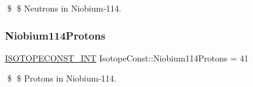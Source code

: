 \$ \$ Neutrons in Niobium-\/114. \mbox{\label{group___isotope_const-_niobium-_nb114_ga6ef4465dfe4e0651754b87ba511a439a}} 
\subsubsection{\texorpdfstring{Niobium114\+Protons}{Niobium114Protons}}
{\footnotesize\ttfamily \mbox{\hyperlink{group___isotope_const-_macros_ga5f18360b3e99483a35c32d789e62621c}{I\+S\+O\+T\+O\+P\+E\+C\+O\+N\+S\+T\+\_\+\+I\+NT}} Isotope\+Const\+::\+Niobium114\+Protons = 41}

\$ \$ Protons in Niobium-\/114. 